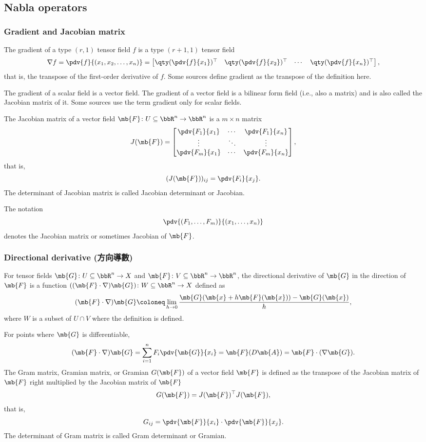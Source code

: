 \subsection{Nabla operators}
\subsubsection{Gradient and Jacobian matrix}
The gradient of a type $(r,1)$ tensor field $f$ is a type $(r+1,1)$ tensor field
\[\nabla f = \pdv{f}{(x_1,x_2,\ldots,x_n)} = \begin{bmatrix}\qty(\pdv{f}{x_1})^{\top} & \qty(\pdv{f}{x_2})^{\top} & \cdots  & \qty(\pdv{f}{x_n})^{\top}\end{bmatrix},\]
that is, the transpose of the first-order derivative of $f$. Some sources define gradient as the transpose of the definition here.

The gradient of a scalar field is a vector field. The gradient of a vector field is a bilinear form field (i.e., also a matrix) and is also called the Jacobian matrix of it. Some sources use the term gradient only for scalar fields.

The Jacobian matrix of a vector field $\mb{F}\colon U\subseteq\bbR^n\to\bbR^n$ is a $m\times n$ matrix
\[J(\mb{F})=\begin{bmatrix}
\pdv{F_1}{x_1} & \cdots & \pdv{F_1}{x_n}\\
\vdots & \ddots & \vdots\\
\pdv{F_m}{x_1} & \cdots & \pdv{F_m}{x_n}
\end{bmatrix},\]
that is,
\[(J(\mb{F}))_{ij}=\pdv{F_i}{x_j}.\]
The determinant of Jacobian matrix is called Jacobian determinant or Jacobian.

The notation
\[\pdv{(F_1,\ldots,F_m)}{(x_1,\ldots,x_n)}\]
denotes the Jacobian matrix or sometimes Jacobian of $\mb{F}$.
\subsubsection{Directional derivative (方向導數)}
For tensor fields $\mb{G}\colon U\subseteq\bbR^n\to X$ and $\mb{F}\colon V\subseteq\bbR^n\to\bbR^n$, the directional derivative of $\mb{G}$ in the direction of $\mb{F}$ is a function $((\mb{F}\cdot\nabla)\mb{G})\colon W\subseteq\bbR^n\to X$ defined as
\[(\mb{F}\cdot\nabla)\mb{G}\coloneq\lim_{h\to 0}\frac{\mb{G}(\mb{x}+h\mb{F}(\mb{x}))-\mb{G}(\mb{x})}{h},\]
where $W$ is a subset of $U\cap V$ where the definition is defined.

For points where $\mb{G}$ is differentiable,
\[(\mb{F}\cdot\nabla)\mb{G}=\sum_{i=1}^nF_i\pdv{\mb{G}}{x_i}=\mb{F}(D\mb{A})=\mb{F}\cdot(\nabla\mb{G}).\]
The Gram matrix, Gramian matrix, or Gramian $G(\mb{F})$ of a vector field $\mb{F}$ is defined as the transpose of the Jacobian matrix of $\mb{F}$ right multiplied by the Jacobian matrix of $\mb{F}$
\[G(\mb{F})=J(\mb{F})^{\top}J(\mb{F}),\]
that is,
\[G_{ij}=\pdv{\mb{F}}{x_i}\cdot\pdv{\mb{F}}{x_j}.\]
The determinant of Gram matrix is called Gram determinant or Gramian.
